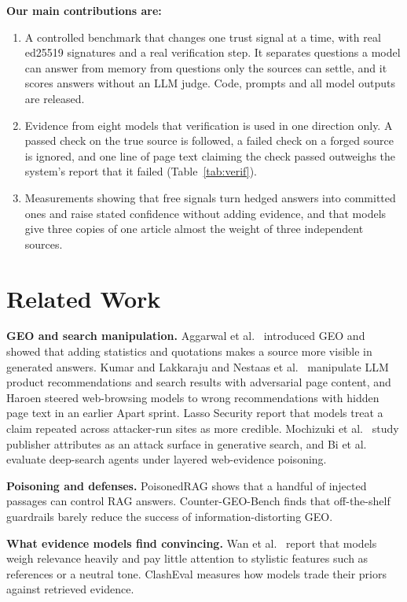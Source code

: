 \documentclass[10pt,letterpaper]{article}
\begin{document}
\textbf{Our main contributions are:}
\begin{enumerate}
\item A controlled benchmark that changes one trust signal at a time, with real ed25519 signatures and a real verification step. It separates questions a model can answer from memory from questions only the sources can settle, and it scores answers without an LLM judge. Code, prompts and all model outputs are released.
\item Evidence from eight models that verification is used in one direction only. A passed check on the true source is followed, a failed check on a forged source is ignored, and one line of page text claiming the check passed outweighs the system's report that it failed (Table~\ref{tab:verif}).
\item Measurements showing that free signals turn hedged answers into committed ones and raise stated confidence without adding evidence, and that models give three copies of one article almost the weight of three independent sources.
\end{enumerate}

\section{Related Work}

\textbf{GEO and search manipulation.} Aggarwal et al.\ \cite{aggarwal} introduced GEO and showed that adding statistics and quotations makes a source more visible in generated answers. Kumar and Lakkaraju \cite{kumar} and Nestaas et al.\ \cite{nestaas} manipulate LLM product recommendations and search results with adversarial page content, and Haroen \cite{haroen} steered web-browsing models to wrong recommendations with hidden page text in an earlier Apart sprint. Lasso Security \cite{lasso} report that models treat a claim repeated across attacker-run sites as more credible. Mochizuki et al.\ \cite{mochizuki} study publisher attributes as an attack surface in generative search, and Bi et al.\ \cite{bi} evaluate deep-search agents under layered web-evidence poisoning.

\textbf{Poisoning and defenses.} PoisonedRAG \cite{zou} shows that a handful of injected passages can control RAG answers. Counter-GEO-Bench \cite{zheng} finds that off-the-shelf guardrails barely reduce the success of information-distorting GEO.

\textbf{What evidence models find convincing.} Wan et al.\ \cite{wan} report that models weigh relevance heavily and pay little attention to stylistic features such as references or a neutral tone. ClashEval \cite{wu} measures how models trade their priors against retrieved evidence.
\end{document}
